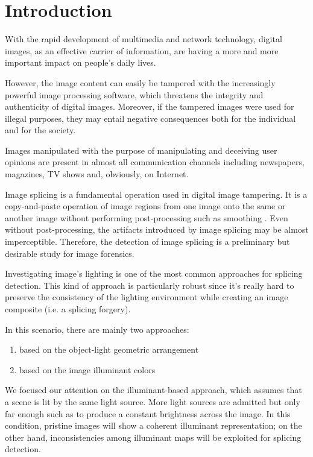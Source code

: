 \chapter*{Introduction}

With the rapid development of multimedia and network technology, digital images, as an effective carrier of information, are having a more and more important impact on people's daily lives. 

However, the image content can easily be tampered with the increasingly powerful image processing software, which threatens the integrity and authenticity of digital images. Moreover, if the tampered images were used for illegal purposes, they may entail negative consequences both for the individual and for the society.

Images manipulated with the purpose of manipulating and deceiving user opinions are present in almost all communication channels including newspapers, magazines, TV shows and, obviously, on Internet.\cite{rocha2011vision}

Image splicing is a fundamental operation used in digital image tampering. It is a copy-and-paste
operation of image regions from one image onto the same or another image without performing post-processing such as smoothing \cite{ng2004blind}. Even without post-processing, the artifacts introduced by
image splicing may be almost imperceptible. Therefore, the detection of image splicing is a preliminary but desirable study for image forensics.

Investigating image's lighting is one of the most common approaches for splicing detection. This kind of approach is particularly robust since it's really hard to preserve the consistency of the lighting environment while creating an image composite (i.e. a splicing forgery). 

In this scenario, there are mainly two approaches:
\begin{enumerate}
\item based on the object-light geometric arrangement
\item based on the image illuminant colors
\end{enumerate}

We focused our attention on the illuminant-based approach, which assumes that a scene is lit by the same light source. More light sources are admitted but only far enough such as to produce a constant brightness across the image. In this condition, pristine images will show a coherent illuminant representation; on the other hand, inconsistencies among illuminant maps will be exploited for splicing detection. 


